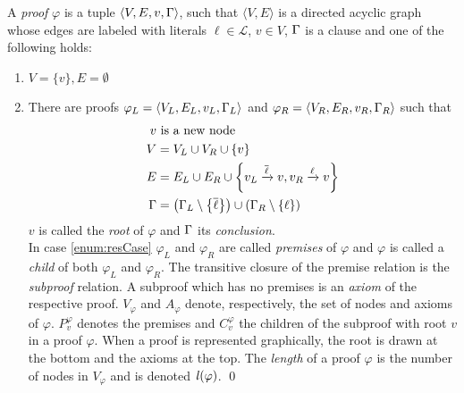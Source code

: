 \documentclass{llncs}
\newcommand{\Vertices}[1]{V_{#1}}
\newcommand{\Premises}[2]{P_{#1}^{#2}}
\newcommand{\Children}[2]{C_{#1}^{#2}}
\newcommand{\Axioms}[1]{A_{#1}}
\begin{document}
\newcommand{\axiom}[1]{\widehat{#1}}
\newcommand{\n}{v}
\newcommand{\raiz}[1]{\rho(#1)}

\begin{definition}[Proof] 
\label{def:proof}
A \emph{proof} $\varphi$ is a tuple $\langle V,E,\n,\clause \rangle$, 
such that $\langle V,E \rangle$ is a directed acyclic graph whose edges are labeled with literals $\ell \in \mathcal{L}$, $\n \in V$, $\Gamma$ is a clause 
and one of the following holds:

\begin{enumerate}
	\item $V = \{\n\}, E = \emptyset$
	\item \label{enum:resCase} There are proofs $\varphi_L = \langle V_L, E_L, \n_L,\clause_L \rangle$ and $\varphi_R = \langle V_R, E_R, \n_R, \clause_R \rangle$ such that 
	    \begin{align*}
			\n & \text{ is a new node} \\
      V &= V_L \cup V_R \cup \{\n \} \\
      E &= E_L \cup E_R \cup
                    \left\{\n_L \xrightarrow{\dual{\ell}} \n , \n_R \xrightarrow{\ell} \n \right\} \\
     \Gamma &= \left( \clause_L \setminus \left\{ \dual{\ell} \right\} \right) \cup \left( \clause_R
                    \setminus \left\{ \ell \right\} \right)
    \end{align*}
		$\n$ is called the \emph{root} of $\varphi$ and $\Gamma$ its \emph{conclusion}.\\
		In case \ref{enum:resCase} $\varphi_L$ and $\varphi_R$ are called \emph{premises} of $\varphi$ and $\varphi$ is called a \emph{child} of both $\varphi_L$ and $\varphi_R$.
		The transitive closure of the premise relation is the \emph{subproof} relation. A subproof which
		has no premises is an \emph{axiom} of the respective proof.
		$\Vertices{\varphi}$ and $\Axioms{\varphi}$ denote, respectively, the set of nodes and axioms of $\varphi$. $\Premises{\n}{\varphi}$ denotes the premises and $\Children{\n}{\varphi}$ the children of the subproof with root $\n$ in a proof $\varphi$. When a proof is represented graphically, the root is drawn at the bottom and the axioms at the top. The \emph{length} of a proof $\varphi$ is the number of nodes in $\Vertices{\varphi}$ and is denoted $\mathit{l}(\varphi)$.
\qed
\end{enumerate}

\end{definition}
\end{document}
